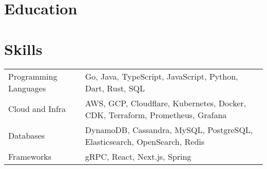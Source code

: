 \documentclass[11pt, letterpaper]{simple-cv}
\begin{document}




\section{Education}
{}

\section{Skills}
\begin{flushleft}
	\begin{tabular}{@{}ll@{}}
		Programming Languages  & Go, Java, TypeScript, JavaScript, Python, Dart, Rust, SQL \\
		Cloud and Infra     & AWS, GCP, Cloudflare, Kubernetes, Docker, CDK, Terraform, Prometheus, Grafana \\
		Databases  & DynamoDB, Cassandra, MySQL, PostgreSQL, Elasticsearch, OpenSearch, Redis  \\
		Frameworks & gRPC, React, Next.js, Spring \\
	\end{tabular}
\end{flushleft}
\end{document}
